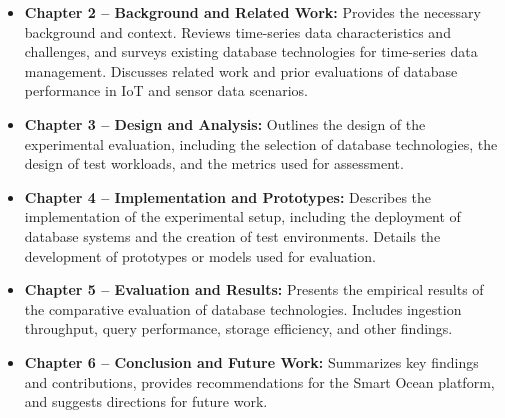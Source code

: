 \begin{itemize}
      \item \textbf{Chapter 2 – Background and Related Work:} Provides the
            necessary background
            and
            context. Reviews time-series data characteristics and challenges,
            and
            surveys existing database technologies for time-series data
            management.
            Discusses related work and prior evaluations of database
            performance
            in
            IoT and sensor data scenarios.
      \item \textbf{Chapter 3 – Design and Analysis:} Outlines the design of
            the
            experimental evaluation, including the selection of database
            technologies, the design of test workloads, and the metrics used
            for assessment.
      \item \textbf{Chapter 4 – Implementation and Prototypes:} Describes the
            implementation of the experimental setup, including the deployment
            of database systems and the creation of test environments. Details
            the development of prototypes or models used for evaluation.
      \item \textbf{Chapter 5 – Evaluation and Results:} Presents the empirical
            results of the
            comparative evaluation of database technologies. Includes ingestion
            throughput, query performance, storage efficiency, and other
            findings.
      \item \textbf{Chapter 6 – Conclusion and Future Work:} Summarizes key
            findings and
            contributions, provides recommendations for the Smart Ocean
            platform,
            and
            suggests directions for future work.
\end{itemize}
